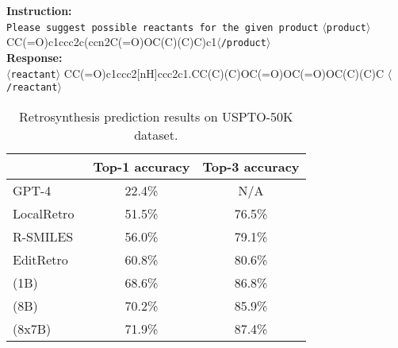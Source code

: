\begin{example}
{{
\small
        \textbf{Instruction: }\\
        \texttt{Please suggest possible reactants for the given product}
        $\langle$\texttt{product}$\rangle$CC(=O)c1ccc2c(ccn2C(=O)OC(C)(C)C)c1$\langle$\texttt{/product}$\rangle$ \\
        \textbf{Response: }\\ 
        $\langle$\texttt{reactant}$\rangle$
        CC(=O)c1ccc2[nH]ccc2c1.CC(C)(C)OC(=O)OC(=O)OC(C)(C)C
        $\langle$\texttt{/reactant}$\rangle$
}}
\end{example}





\begin{table}[!h]
\centering
\begin{tabular}{lcc}
\toprule
& Top-1 accuracy & Top-3 accuracy \\
\midrule
GPT-4 & 22.4\% & N/A \\
LocalRetro~\cite{chen2021localretro} & 51.5\% & 76.5\% \\ 
R-SMILES~\cite{Zhong2022rsmiles} & 56.0\%  & 79.1\% \\
EditRetro~\cite{han2024editretro} & 60.8\% & 80.6\% \\ 
\midrule
\ourM{} (1B) & 68.6\% & 86.8\%\\
\ourM{} (8B) & 70.2\% & 85.9\% \\
\ourM{} (8x7B) & 71.9\% & 87.4\% \\
\bottomrule
\end{tabular}
\caption{Retrosynthesis prediction results on USPTO-50K dataset.}
\label{tab:retro-uspto50k}
\end{table}




